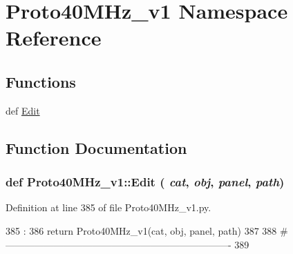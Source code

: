 \hypertarget{namespaceProto40MHz__v1}{
\section{Proto40MHz\_\-v1 Namespace Reference}
\label{namespaceProto40MHz__v1}
}
\subsection*{Functions}
\begin{DoxyCompactItemize}
\item 
def \hyperlink{namespaceProto40MHz__v1_a5c2dac60e8f6636e9cce514eed2d12df}{Edit}
\end{DoxyCompactItemize}


\subsection{Function Documentation}
\hypertarget{namespaceProto40MHz__v1_a5c2dac60e8f6636e9cce514eed2d12df}{
\subsubsection[{Edit}]{\setlength{\rightskip}{0pt plus 5cm}def Proto40MHz\_\-v1::Edit ( {\em cat}, \/   {\em obj}, \/   {\em panel}, \/   {\em path})}}
\label{namespaceProto40MHz__v1_a5c2dac60e8f6636e9cce514eed2d12df}


Definition at line 385 of file Proto40MHz\_\-v1.py.


\begin{DoxyCode}
385                                 :
386     return Proto40MHz_v1(cat, obj, panel, path)
387 
388 #----------------------------------------------------------------------
389 

\end{DoxyCode}
